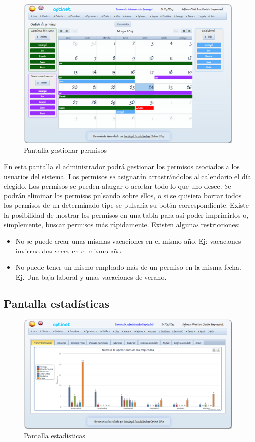 \documentclass[a4paper,11pt]{book}
\begin{document}
\begin{figure}[!htb]
  \centering
    \includegraphics[scale=0.35]{cappermisos.png}
  \caption{Pantalla gestionar permisos}
  \label{a}
\end{figure}

En esta pantalla el administrador podrá gestionar los permisos asociados a los usuarios del sistema. Los permisos se asignarán arrastrándolos al calendario el día elegido. Los permisos se pueden alargar o acortar todo lo que uno desee. Se podrán eliminar los permisos pulsando sobre ellos, o si se quisiera borrar todos los permisos de un determinado tipo se pulsaría su botón correspondiente. Existe la posibilidad de mostrar los permisos en una tabla para así poder imprimirlos o, simplemente, buscar permisos más rápidamente. Existen algunas restricciones:
\begin{itemize}
\item No se puede crear unas mismas vacaciones en el mismo año. Ej: vacaciones invierno dos veces en el mismo año.
\item No puede tener un mismo empleado más de un permiso en la misma fecha. Ej. Una baja laboral y unas vacaciones de verano.
\end{itemize}

\newpage
\subsection {Pantalla estadísticas}

\begin{figure}[!htb]
  \centering
    \includegraphics[scale=0.35]{capestadisticas.png}
  \caption{Pantalla estadísticas}
  \label{a}
\end{figure}
\end{document}
